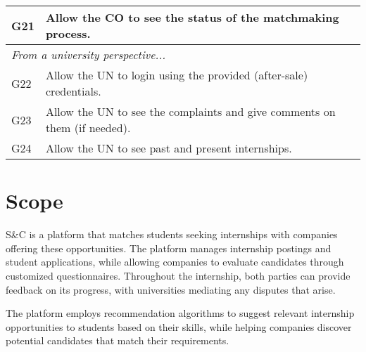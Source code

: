 \begin{table}[H]
\begin{longtable}{|l|p{}|}
        \hline
        G21           & Allow the CO to see the status of the matchmaking process.                                                                                        \\
        \hline \hline
        \multicolumn{2}{|l|}{\textit{From a university perspective...}}                                                                                                   \\
        \hline
        G22           & Allow the UN to login using the provided (after-sale) credentials.                                                                                \\
        \hline
        G23           & Allow the UN to see the complaints and give comments on them (if needed).                                                                         \\
        \hline
        G24           & Allow the UN to see past and present internships.                                                                                                 \\
        \hline
    \end{longtable}
\end{table}

\section{Scope}
\label{sec:scope}%

\par S\&C is a platform that matches students seeking internships with companies offering these opportunities. The
platform manages internship postings and student applications, while allowing companies to evaluate candidates through
customized questionnaires. Throughout the internship, both parties can provide feedback on its progress, with
universities mediating any disputes that arise.

\par The platform employs recommendation algorithms to suggest relevant internship opportunities to students based on
their skills, while helping companies discover potential candidates that match their requirements.
